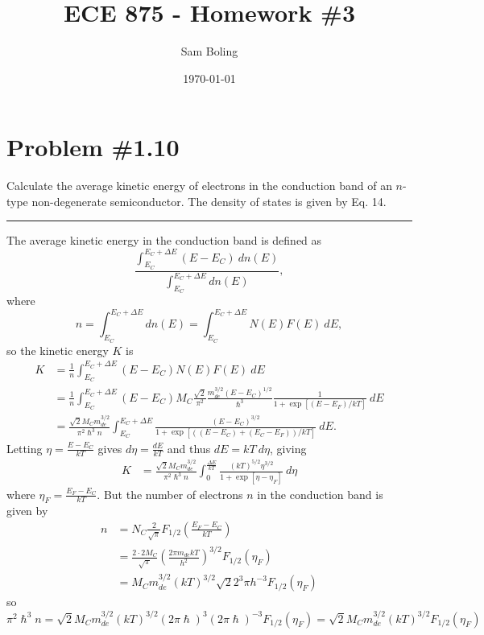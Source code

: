 \documentclass{article}
\title{ECE 875 - Homework \#3}
\author{Sam Boling}
\date{\today}
\newcommand{\horline}
           {\begin{center}
              \noindent\rule{8cm}{0.4pt}
            \end{center}}
\begin{document}
\maketitle

\section*{Problem \#1.10}
Calculate the average kinetic energy of electrons in the conduction band of 
an $n$-type non-degenerate semiconductor. The density of states is given by
Eq. 14.
\horline
The average kinetic energy in the conduction band is defined as
$$
\frac{\int_{E_C}^{E_C + \Delta E} (E - E_C) ~dn(E)}
     {\int_{E_C}^{E_C + \Delta E} dn(E)},
$$
where
$$
n = \int_{E_C}^{E_C + \Delta E} dn(E) 
  = \int_{E_C}^{E_C + \Delta E} N(E) F(E) ~dE,
$$
so the kinetic energy $K$ is
\begin{align*}
K &= \frac{1}{n}\int_{E_C}^{E_C + \Delta E} (E - E_C) N(E) F(E) ~dE \\
  &= \frac{1}{n}\int_{E_C}^{E_C + \Delta E} 
             (E - E_C) 
             M_C \frac{\sqrt{2}}{\pi^2}
                 \frac{m_{de}^{3/2}(E - E_C)^{1/2}}{\hslash^3}
                 \frac{1}{1 + \exp[(E - E_F)/kT]} ~dE \\
  &= \frac{\sqrt{2} M_C m_{de}^{3/2}}{\pi^2 \hslash^3 n}
     \int_{E_C}^{E_C + \Delta E} 
        \frac{(E - E_C)^{3/2}}
             {1 + \exp[((E - E_C) + (E_C - E_F))/kT]} ~dE.
\end{align*}
Letting $\eta = \frac{E - E_C}{kT}$ gives $d\eta = \frac{dE}{kT}$ and
thus $dE = kT ~d\eta$, giving
\begin{align*}
K &=  \frac{\sqrt{2} M_C m_{de}^{3/2}}{\pi^2 \hslash^3 n}
   \int_{0}^{\frac{\Delta E}{kT}} 
     \frac{(kT)^{5/2}\eta^{3/2}}{1 + \exp[\eta - \eta_F]} ~d\eta
\end{align*}
where $\eta_F = \frac{E_F - E_C}{kT}$.
But the number of electrons $n$ in the conduction band is given by
\begin{align*}
n &= N_C \frac{2}{\sqrt{\pi}} F_{1/2}\left(\frac{E_F - E_C}{kT}\right) \\
  &= \frac{2 \cdot 2 M_C}{\sqrt{\pi}} 
    \left(\frac{2 \pi m_{de} kT}{h^2}\right)^{3/2} 
    F_{1/2}(\eta_F) \\
  &= M_C m_{de}^{3/2} (kT)^{3/2} \sqrt{2}2^3 \pi h^{-3}
    F_{1/2}(\eta_F)
\end{align*}
so
$$
\pi^2 \hslash^3 n = \sqrt{2} M_C m_{de}^{3/2} (kT)^{3/2} 
                    (2\pi\hslash)^3 (2 \pi \hslash)^{-3}
                    F_{1/2}(\eta_F)
                  = \sqrt{2} M_C m_{de}^{3/2} (kT)^{3/2}
                    F_{1/2}(\eta_F)
$$
\end{document}
